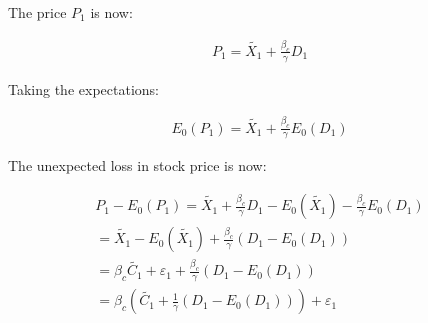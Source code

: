 The price $P_1$ is now:

\begin{equation}
    \begin{aligned}
    P_1 = \tilde{X_1} + \frac{\beta_{c}}{\gamma}D_1
    \end{aligned}
\end{equation}

Taking the expectations:

\begin{equation}
    \begin{aligned}
    E_0(P_1) = \tilde{X_1} + \frac{\beta_{c}}{\gamma}E_0(D_1) 
    \end{aligned}
\end{equation}

The unexpected loss in stock price is now:

\begin{equation}
    \begin{aligned}
    P_1 - E_0(P_1) = \tilde{X_1} + \frac{\beta_{c}}{\gamma}D_1 - E_0(\tilde{X_1}) - \frac{\beta_{c}}{\gamma}E_0(D_1) \\
    = \tilde{X_1} - E_0(\tilde{X_1}) + \frac{\beta_{c}}{\gamma}(D_1 - E_0(D_1)) \\
    = \beta_{c} \tilde{C_1} + \varepsilon_1 + \frac{\beta_{c}}{\gamma}(D_1 - E_0(D_1)) \\
    = \beta_{c}(\tilde{C_1} + \frac{1}{\gamma}(D_1 - E_0(D_1))) + \varepsilon_1
    \end{aligned}
\end{equation}

